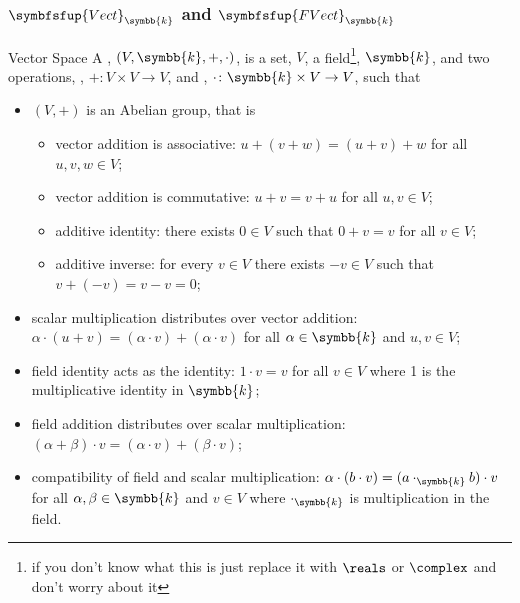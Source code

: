 \documentclass[fleqn]{NotesClass}
\makeatletter
\newcommand{\c@egory}[1]{\symbfsfup{#1}}
\renewcommand{\field}{\symbb{k}}
\newcommand{\Vect}[1][\field]{{\c@egory{Vect}_{#1}}}
\newcommand{\FVect}[1][\field]{{\c@egory{FVect}_{#1}}}
\makeatother
\begin{document}
    \subsubsection{\texorpdfstring{\(\Vect\) and \(\FVect\)}{Vect and FVect}}
    \begin{dfn}{Vector Space}{}
        A , \((V, \field, +, \cdot)\), is a set, \(V\), a field\footnote{if you don't know what this is just replace it with \(\reals\) or \(\complex\) and don't worry about it}, \(\field\), and two operations, , \(+ \colon V \times V \to V\), and , \(\cdot \colon \field \times V \to V\), such that
        \begin{itemize}
            \item \((V, +)\) is an Abelian group, that is
            \begin{itemize}
                \item vector addition is associative: \(u + (v + w) = (u + v) + w\) for all \(u, v, w \in V\);
                \item vector addition is commutative: \(u + v = v + u\) for all \(u, v \in V\);
                \item additive identity: there exists \(0 \in V\) such that \(0 + v = v\) for all \(v \in V\);
                \item additive inverse: for every \(v \in V\) there exists \(-v \in V\) such that \(v + (-v) = v - v = 0\);
            \end{itemize}
            \item scalar multiplication distributes over vector addition: \(\alpha \cdot (u + v) = (\alpha \cdot v) + (\alpha \cdot v)\) for all \(\alpha \in \field\) and \(u, v \in V\);
            \item field identity acts as the identity: \(1 \cdot v = v\) for all \(v \in V\) where 1 is the multiplicative identity in \(\field\);
            \item field addition distributes over scalar multiplication: \((\alpha + \beta) \cdot v = (\alpha \cdot v) + (\beta \cdot v)\);
            \item compatibility of field and scalar multiplication: \(\alpha \cdot (b \cdot v) = (a \cdot_{\field} b) \cdot v\) for all \(\alpha, \beta \in \field\) and \(v \in V\) where \(\cdot_{\field}\) is multiplication in the field.
        \end{itemize}
    \end{dfn}
    
\end{document}
